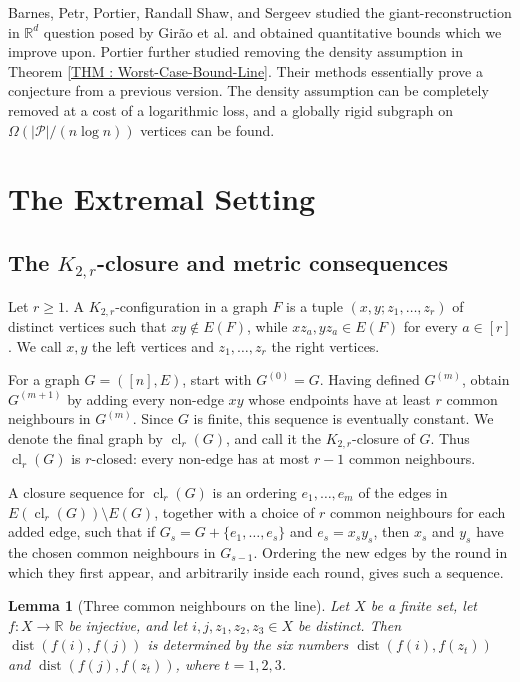 \documentclass[fullpage,11pt]{article}
\providecommand{\dist}{\operatorname{dist}}
\theoremstyle{break}
\newtheorem{lemma}[theorem]{Lemma}
\theoremstyle{definition}
\theoremstyle{break}
\begin{document}
Barnes, Petr, Portier, Randall Shaw, and Sergeev \cite{FUWbarnes2024reconstructing} studied the giant-reconstruction in $\mathbb{R}^d$ question posed by Girão et al. and obtained quantitative bounds which we improve upon. Portier \cite{portier2026reconstructing} further studied removing the density assumption in Theorem \ref{THM : Worst-Case-Bound-Line}. Their methods essentially prove a conjecture from a previous version. The density assumption can be completely removed at a cost of a logarithmic loss, and a globally rigid subgraph on $\Omega(|\mathcal P|/(n\log n))$ vertices can be found.



\section{The Extremal Setting}

\subsection{The \(K_{2,r}\)-closure and metric consequences}

Let \(r\geq1\). A \(K_{2,r}\)-configuration in a graph \(F\) is a tuple \((x,y;z_1,\ldots,z_r)\) of distinct vertices such that \(xy\notin E(F)\), while \(xz_a,yz_a\in E(F)\) for every \(a\in[r]\). We call \(x,y\) the left vertices and \(z_1,\ldots,z_r\) the right vertices.

For a graph \(G=([n],E)\), start with \(G^{(0)}=G\). Having defined \(G^{(m)}\), obtain \(G^{(m+1)}\) by adding every non-edge \(xy\) whose endpoints have at least \(r\) common neighbours in \(G^{(m)}\). Since \(G\) is finite, this sequence is eventually constant. We denote the final graph by \(\operatorname{cl}_r(G)\), and call it the \(K_{2,r}\)-closure of \(G\). Thus \(\operatorname{cl}_r(G)\) is \(r\)-closed: every non-edge has at most \(r-1\) common neighbours.

A closure sequence for \(\operatorname{cl}_r(G)\) is an ordering \(e_1,\ldots,e_m\) of the edges in \(E(\operatorname{cl}_r(G))\setminus E(G)\), together with a choice of \(r\) common neighbours for each added edge, such that if \(G_s=G+\{e_1,\ldots,e_s\}\) and \(e_s=x_sy_s\), then \(x_s\) and \(y_s\) have the chosen common neighbours in \(G_{s-1}\). Ordering the new edges by the round in which they first appear, and arbitrarily inside each round, gives such a sequence.

\begin{lemma}[Three common neighbours on the line]\label{lem:three-common-neighbours-line}
Let \(X\) be a finite set, let \(f\colon X\to\mathbb R\) be injective, and let \(i,j,z_1,z_2,z_3\in X\) be distinct. Then \(\dist(f(i),f(j))\) is determined by the six numbers \(\dist(f(i),f(z_t))\) and \(\dist(f(j),f(z_t))\), where \(t=1,2,3\).
\end{lemma}
\end{document}
